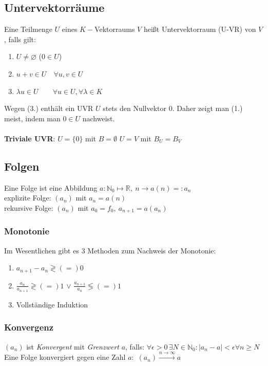 \documentclass[6pt,a4paper]{scrartcl}
\newcommand{\abs}[1]{\ensuremath{\left\vert#1\right\vert}}
\newcommand{\N}{\ensuremath{\mathbb N}}
\newcommand{\R}{\ensuremath{\mathbb R}}
\begin{document}
\begin{multicols}{4}
\subsection{Untervektorräume}
Eine Teilmenge $U$ eines $K-$Vektorraums $V$ heißt Untervektorraum (U-VR) von $V$, falls gilt:
\begin{enumerate}\itemsep0pt
\item $U\neq \varnothing$ \qquad ($0\in U$)
\item $u+v\in U \quad \forall u,v\in U$
\item $\lambda u \in U \qquad \forall u\in U,\forall \lambda \in K$
\end{enumerate}
Wegen (3.) enthält ein UVR $U$ stets den Nullvektor $0$. Daher zeigt man (1.) meist, indem man $0\in U$ nachweist.\\
\\
\textbf{Triviale UVR}: $U=\{0\}$ mit $B = \emptyset$ \qquad $U=V$ mit $B_U=B_V$



\subsection{Folgen}
Eine Folge ist eine Abbildung $a: \N_0 \mapsto \R,\ n \rightarrow a(n) =: a_n$\\
explizite Folge: $(a_n)$ mit $a_n=a(n)$\\ rekursive Folge: $(a_n)$ mit $a_0=f_0,\  a_{n+1}=a(a_n)$\\

\subsubsection{Monotonie}
Im Wesentlichen gibt es 3 Methoden zum Nachweis der Monotonie:
\begin{enumerate}\itemsep0pt
\item $a_{n+1} - a_n \gtrless (=) 0$
\item $\frac{a_n}{a_{n+1}} \gtrless (=) 1$ \qquad $\lor$ \qquad $\frac{a_{n+1}}{a_n} \lessgtr (=) 1$
\item Vollständige Induktion
\end{enumerate}

\subsubsection{Konvergenz}
$(a_n)$ ist \emph{Konvergent} mit \emph{Grenzwert} $a$, falls: $\forall \epsilon > 0\, \exists N  \in \N_0:  \abs{a_n -a} < \epsilon  \forall n \ge N$\\
Eine Folge konvergiert gegen eine Zahl $a$:\ $(a_n) \overset{n \rightarrow \infty}{\longrightarrow} a$\\

\end{multicols}
\end{document}
